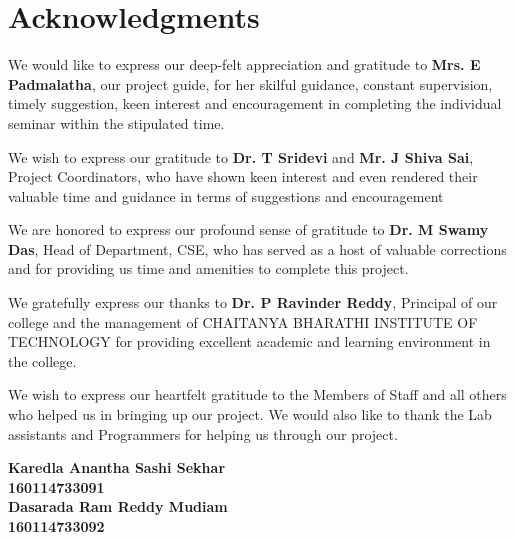 \cleardoublepage
{}
{}
\chapter*{Acknowledgments}
\vspace{-0.55in}
We would like to express our deep-felt appreciation and gratitude to \textbf{Mrs. E Padmalatha}, our project guide, for her skilful guidance, constant supervision, timely suggestion, keen interest and encouragement in completing the individual seminar within the stipulated time.
\par
We wish to express our gratitude to \textbf{Dr. T Sridevi} and \textbf{Mr. J Shiva Sai}, Project Coordinators, who have shown keen interest and even rendered their valuable time and guidance in terms of suggestions and encouragement
\par
We are honored to express our profound sense of gratitude to \textbf{Dr. M Swamy Das}, Head of Department, CSE, who has served as a host of valuable corrections and for providing us time and amenities to complete this project.
\par
We gratefully express our thanks to \textbf{Dr. P Ravinder Reddy}, Principal of our college and the management of CHAITANYA BHARATHI INSTITUTE OF TECHNOLOGY for providing excellent academic and learning environment in the college.
\par
We wish to express our heartfelt gratitude to the Members of Staff and all others who helped us in bringing up our project. We would also like to thank the Lab assistants and Programmers for helping us through our project.
\\
\begin{flushright}
\textbf{Karedla Anantha Sashi Sekhar}\\\textbf{160114733091}\\\textbf{Dasarada Ram Reddy Mudiam}\\\textbf{160114733092}
\end{flushright}
\newpage
